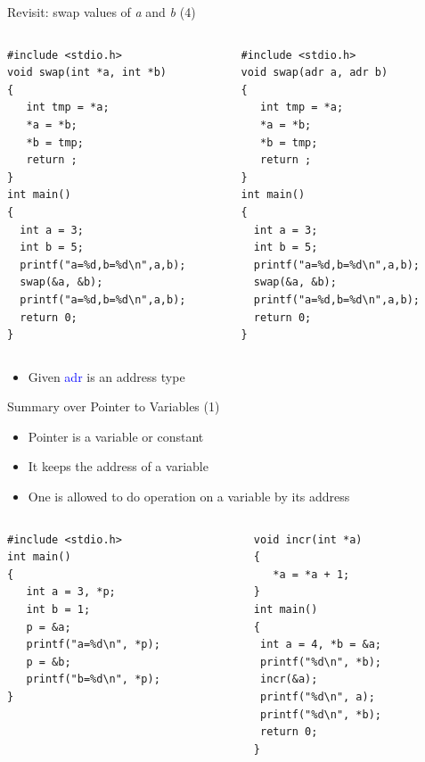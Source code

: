 \begin{frame}[fragile]{Revisit: swap values of \textit{a} and \textit{b} (4)}
\vspace{-0.25in}
\begin{columns}
\begin{column}{0.47\linewidth}
\begin{lstlisting}
#include <stdio.h>
void swap(int *a, int *b)
{
   int tmp = *a;
   *a = *b;
   *b = tmp;
   return ;
}
int main()
{
  int a = 3; 
  int b = 5;
  printf("a=%d,b=%d\n",a,b);
  swap(&a, &b);
  printf("a=%d,b=%d\n",a,b);
  return 0;
}
\end{lstlisting}
\end{column}
\begin{column}{0.47\linewidth}
\begin{lstlisting}[xleftmargin=0.005\linewidth]
#include <stdio.h>
void swap(adr a, adr b)
{
   int tmp = *a;
   *a = *b;
   *b = tmp;
   return ;
}
int main()
{
  int a = 3; 
  int b = 5;
  printf("a=%d,b=%d\n",a,b);
  swap(&a, &b);
  printf("a=%d,b=%d\n",a,b);
  return 0;
}
\end{lstlisting}
\end{column}
\end{columns}
\vspace{-0.1in}
\begin{itemize}
	\item {Given \textcolor{blue}{adr} is an address type}
\end{itemize}
\end{frame}

\begin{frame}[fragile]{Summary over Pointer to Variables (1)}
\vspace{-0.15in}
\begin{itemize}
	\item {Pointer is a variable or constant}
    \item {It keeps the address of a variable}
    \item {One is allowed to do operation on a variable by its address}
\end{itemize}
\begin{columns}
\begin{column}{0.4\linewidth}
\begin{lstlisting}
#include <stdio.h>
int main()
{
   int a = 3, *p;
   int b = 1;
   p = &a;
   printf("a=%d\n", *p);
   p = &b;
   printf("b=%d\n", *p);
}
\end{lstlisting}
\end{column}
\begin{column}{0.45\linewidth}
\begin{lstlisting}
void incr(int *a)
{
   *a = *a + 1;
}
int main()
{
 int a = 4, *b = &a;
 printf("%d\n", *b);
 incr(&a);
 printf("%d\n", a);
 printf("%d\n", *b);
 return 0;
}
\end{lstlisting}
\end{column}
\end{columns}
\end{frame}

